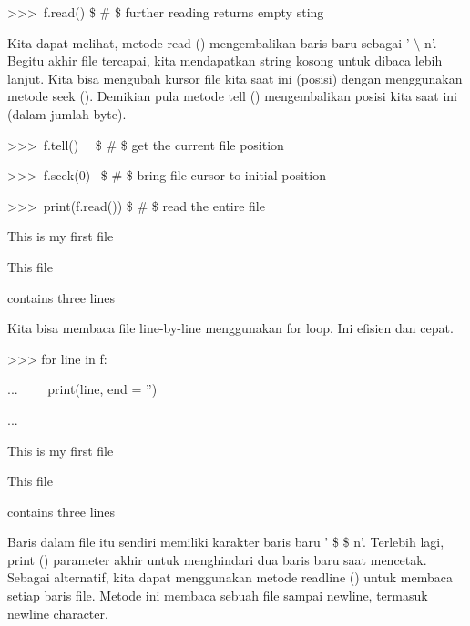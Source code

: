 \vspace{12pt}
\noindent 
>>>~f.read()   \$  \#  \$ further reading returns empty sting \par
\vspace{12pt}
Kita dapat melihat, metode read () mengembalikan baris baru sebagai ' $  \setminus  $ n'. Begitu akhir file tercapai, kita mendapatkan string kosong untuk dibaca lebih lanjut. Kita bisa mengubah kursor file kita saat ini (posisi) dengan menggunakan metode seek (). Demikian pula metode tell () mengembalikan posisi kita saat ini (dalam jumlah byte). \par
\vspace{12pt}
\noindent 
>>>~f.tell()~~   \$  \#  \$ get the current file position \par
{} \par
\vspace{12pt}
\noindent 
>>>~f.seek(0)~   \$  \#  \$ bring file cursor to initial position \par
{} \par
\vspace{12pt}
\noindent 
>>>~print(f.read())   \$  \#  \$ read the entire file \par
\noindent 
This is my first file \par
\noindent 
This file \par
\noindent 
contains three lines \par
\vspace{12pt}
\vspace{12pt}
\noindent 
Kita bisa membaca file line-by-line menggunakan for loop. Ini efisien dan cepat. \par
\vspace{12pt}
\noindent 
>>> for line in f: \par
\noindent 
...~~~~ print(line, end = '') \par
\noindent 
... \par
\noindent 
This is my first file \par
\noindent 
This file \par
\noindent 
contains three lines \par
Baris dalam file itu sendiri memiliki karakter baris baru ' \$  \setminus  \$ n'. Terlebih lagi, print () parameter akhir untuk menghindari dua baris baru saat mencetak. Sebagai alternatif, kita dapat menggunakan metode readline () untuk membaca setiap baris file. Metode ini membaca sebuah file sampai newline, termasuk newline character. \par
\vspace{12pt}

